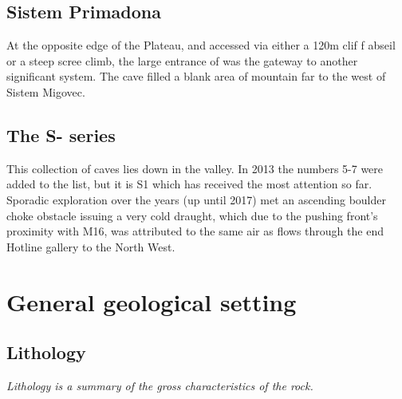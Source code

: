 \subsection{Sistem Primadona} At the opposite edge of the Plateau, and accessed via either a 120m clif f abseil or a steep scree climb, the large entrance of  was the gateway to another significant system. The cave filled a blank area of mountain far to the west of Sistem Migovec. 

\subsection{The S- series} This collection of caves lies down in   the  valley. In 2013 the numbers 5-7 were added to the list, but it is S1 which has received the most attention so far. Sporadic exploration over the years (up until 2017) met an ascending boulder choke obstacle issuing a very cold draught, which due to the pushing front's proximity with M16, was attributed to the same air as flows through the end Hotline gallery to the North West. 



\section{General geological setting}

\subsection{Lithology}
\emph{Lithology is a summary of the gross characteristics of the rock.}

